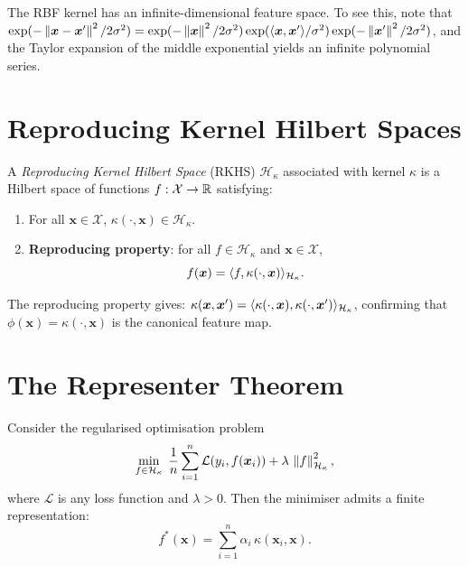 \begin{remark}
The RBF kernel has an infinite-dimensional feature space. To see this, note that $\exp(-\left\| \bm{x}-\bm{x}' \right\|^2/2\sigma^2)=\exp(-\left\| \bm{x} \right\|^2/2\sigma^2)\exp(\langle \bm{x}, \bm{x}' \rangle/\sigma^2)\exp(-\left\| \bm{x}' \right\|^2/2\sigma^2)$, and the Taylor expansion of the middle exponential yields an infinite polynomial series.
\end{remark}

\section{Reproducing Kernel Hilbert Spaces}

\begin{definition}[RKHS]
A \emph{Reproducing Kernel Hilbert Space} (RKHS) $\mathcal{H}_\kappa$ associated with kernel $\kappa$ is a Hilbert space of functions $f:\mathcal{X}\to\mathbb{R}$ satisfying:
\begin{enumerate}
  \item For all $\bm{x}\in\mathcal{X}$, $\kappa(\cdot,\bm{x})\in\mathcal{H}_\kappa$.
  \item \textbf{Reproducing property}: for all $f\in\mathcal{H}_\kappa$ and $\bm{x}\in\mathcal{X}$,
    \[
      f(\bm{x}) = \langle f, \kappa(\cdot,\bm{x}) \rangle_{\mathcal{H}_\kappa}.
    \]
\end{enumerate}
\end{definition}

\begin{remark}
The reproducing property gives: $\kappa(\bm{x},\bm{x}')=\langle \kappa(\cdot,\bm{x}), \kappa(\cdot,\bm{x}') \rangle_{\mathcal{H}_\kappa}$, confirming that $\phi(\bm{x})=\kappa(\cdot,\bm{x})$ is the canonical feature map.
\end{remark}

\section{The Representer Theorem}

\begin{theorem}
Consider the regularised optimisation problem
\[
  \min_{f\in\mathcal{H}_\kappa}\; \frac{1}{n}\sum_{i=1}^n \mathcal{L}(y_i, f(\bm{x}_i))
  + \lambda\,\left\| f \right\|^2_{\mathcal{H}_\kappa},
\]
where $\mathcal{L}$ is any loss function and $\lambda>0$. Then the minimiser admits a finite representation:
\[
  f^*(\bm{x}) = \sum_{i=1}^n \alpha_i\,\kappa(\bm{x}_i,\bm{x}).
\]
\end{theorem}

